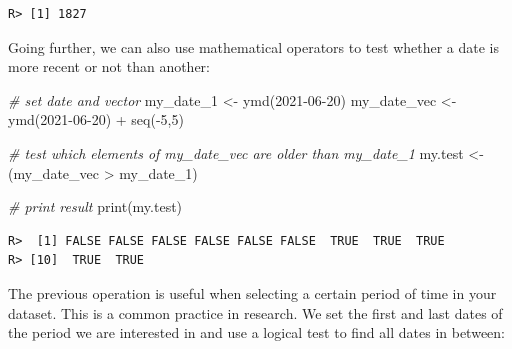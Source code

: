 \documentclass[
  12pt,
]{book}
\newenvironment{Shaded}{\begin{snugshade}}{\end{snugshade}}
\newcommand{\CommentTok}[1]{\textcolor[rgb]{0.37,0.37,0.37}{\textit{#1}}}
\newcommand{\DecValTok}[1]{\textcolor[rgb]{0.06,0.06,0.06}{#1}}
\newcommand{\FunctionTok}[1]{\textcolor[rgb]{0,0,0}{#1}}
\newcommand{\NormalTok}[1]{#1}
\newcommand{\OtherTok}[1]{\textcolor[rgb]{0.37,0.37,0.37}{#1}}
\newcommand{\SpecialCharTok}[1]{\textcolor[rgb]{0,0,0}{#1}}
\newcommand{\StringTok}[1]{\textcolor[rgb]{0.5,0.5,0.5}{#1}}
\begin{document}
\begin{verbatim}
R> [1] 1827
\end{verbatim}

Going further, we can also use mathematical operators to test whether a date is more recent or not than another:

\begin{Shaded}
\begin{Highlighting}[]
\CommentTok{\# set date and vector}
\NormalTok{my\_date\_1 }\OtherTok{\textless{}{-}} \FunctionTok{ymd}\NormalTok{(}\StringTok{\textquotesingle{}2021{-}06{-}20\textquotesingle{}}\NormalTok{)}
\NormalTok{my\_date\_vec }\OtherTok{\textless{}{-}} \FunctionTok{ymd}\NormalTok{(}\StringTok{\textquotesingle{}2021{-}06{-}20\textquotesingle{}}\NormalTok{) }\SpecialCharTok{+} \FunctionTok{seq}\NormalTok{(}\SpecialCharTok{{-}}\DecValTok{5}\NormalTok{,}\DecValTok{5}\NormalTok{)}

\CommentTok{\# test which elements of my\_date\_vec are older than my\_date\_1}
\NormalTok{my.test }\OtherTok{\textless{}{-}}\NormalTok{ (my\_date\_vec }\SpecialCharTok{\textgreater{}}\NormalTok{ my\_date\_1)}

\CommentTok{\# print result}
\FunctionTok{print}\NormalTok{(my.test)}
\end{Highlighting}
\end{Shaded}

\begin{verbatim}
R>  [1] FALSE FALSE FALSE FALSE FALSE FALSE  TRUE  TRUE  TRUE
R> [10]  TRUE  TRUE
\end{verbatim}

The previous operation is useful when selecting a certain period of time in your dataset. This is a common practice in research. We set the first and last dates of the period we are interested in and use a logical test to find all dates in between:
\end{document}
